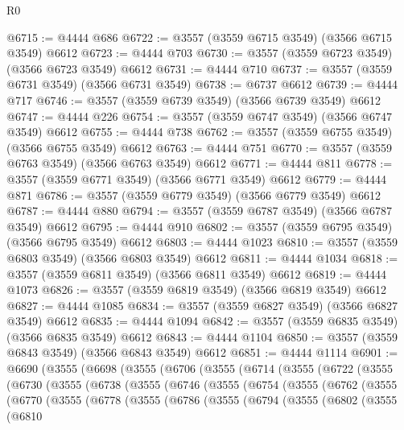 \begin{lexlean}{R0}
\begin{coremodule}
@6715 := @4444 @686
@6722 := @3557 (@3559 @6715 @3549) (@3566 @6715 @3549) @6612
@6723 := @4444 @703
@6730 := @3557 (@3559 @6723 @3549) (@3566 @6723 @3549) @6612
@6731 := @4444 @710
@6737 := @3557 (@3559 @6731 @3549) (@3566 @6731 @3549)
@6738 := @6737 @6612
@6739 := @4444 @717
@6746 := @3557 (@3559 @6739 @3549) (@3566 @6739 @3549) @6612
@6747 := @4444 @226
@6754 := @3557 (@3559 @6747 @3549) (@3566 @6747 @3549) @6612
@6755 := @4444 @738
@6762 := @3557 (@3559 @6755 @3549) (@3566 @6755 @3549) @6612
@6763 := @4444 @751
@6770 := @3557 (@3559 @6763 @3549) (@3566 @6763 @3549) @6612
@6771 := @4444 @811
@6778 := @3557 (@3559 @6771 @3549) (@3566 @6771 @3549) @6612
@6779 := @4444 @871
@6786 := @3557 (@3559 @6779 @3549) (@3566 @6779 @3549) @6612
@6787 := @4444 @880
@6794 := @3557 (@3559 @6787 @3549) (@3566 @6787 @3549) @6612
@6795 := @4444 @910
@6802 := @3557 (@3559 @6795 @3549) (@3566 @6795 @3549) @6612
@6803 := @4444 @1023
@6810 := @3557 (@3559 @6803 @3549) (@3566 @6803 @3549) @6612
@6811 := @4444 @1034
@6818 := @3557 (@3559 @6811 @3549) (@3566 @6811 @3549) @6612
@6819 := @4444 @1073
@6826 := @3557 (@3559 @6819 @3549) (@3566 @6819 @3549) @6612
@6827 := @4444 @1085
@6834 := @3557 (@3559 @6827 @3549) (@3566 @6827 @3549) @6612
@6835 := @4444 @1094
@6842 := @3557 (@3559 @6835 @3549) (@3566 @6835 @3549) @6612
@6843 := @4444 @1104
@6850 := @3557 (@3559 @6843 @3549) (@3566 @6843 @3549) @6612
@6851 := @4444 @1114
@6901 := @6690
    (@3555
      (@6698
        (@3555
          (@6706
            (@3555
              (@6714
                (@3555
                  (@6722
                    (@3555
                      (@6730
                        (@3555
                          (@6738
                            (@3555
                              (@6746
                                (@3555
                                  (@6754
                                    (@3555
                                      (@6762
                                        (@3555
                                          (@6770
                                            (@3555
                                              (@6778
                                                (@3555
                                                  (@6786
                                                    (@3555
                                                      (@6794
                                                        (@3555
                                                          (@6802
                                                            (@3555
                                                              (@6810

\end{coremodule}
\end{lexlean}
